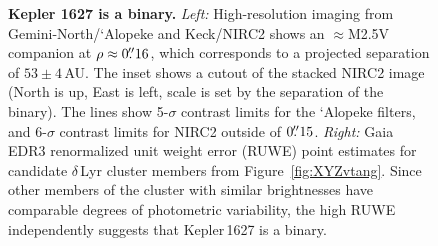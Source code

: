 \documentclass[12pt,modern,twocolumn,tighten]{aastex63}
\begin{document}
\begin{figure}[tp]
	\begin{center}
		\leavevmode
	\end{center}
	\vspace{-0.5cm}
	\caption{
    {\bf Kepler 1627 is a binary.} {\it Left:} High-resolution imaging
    from Gemini-North/`Alopeke and Keck/NIRC2 shows an $\approx$M2.5V
    companion at $\rho \approx 0\mbox{$.\!\!^{\prime\prime}$}16$, which corresponds to a
    projected separation of $53\pm4$\,AU.  The inset shows a cutout of
    the stacked NIRC2 image (North is up, East is left, scale is set by the
    separation of the binary).  The lines show 5-$\sigma$ contrast
    limits for the `Alopeke filters, and 6-$\sigma$ contrast limits
    for NIRC2 outside of $0\mbox{$.\!\!^{\prime\prime}$}15$. {\it Right:} Gaia
    EDR3 renormalized unit weight error (RUWE) point estimates for
    candidate $\delta$\,Lyr cluster
    members from Figure~\ref{fig:XYZvtang}.  Since other members of the
    cluster with similar brightnesses have comparable degrees of
    photometric variability, the high RUWE independently suggests that Kepler\,1627
    is a binary. 
    \label{fig:kep1627binary}
	}
\end{figure}
\end{document}
